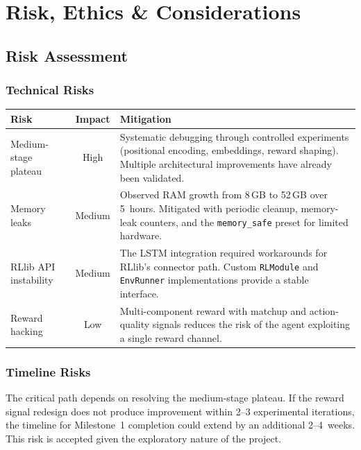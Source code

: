 \chapter{Risk, Ethics \& Considerations}
\label{ch:risk}

\section{Risk Assessment}

\subsection{Technical Risks}

\begin{center}
\small
\begin{tabularx}{\textwidth}{l c X}
  \toprule
  \textbf{Risk} & \textbf{Impact} & \textbf{Mitigation} \\
  \midrule
  Medium-stage plateau &
    High &
    Systematic debugging through controlled experiments (positional
    encoding, embeddings, reward shaping).  Multiple architectural
    improvements have already been validated. \\
  Memory leaks &
    Medium &
    Observed RAM growth from 8\,GB to 52\,GB over 5~hours.  Mitigated with
    periodic cleanup, memory-leak counters, and the \texttt{memory\_safe}
    preset for limited hardware. \\
  RLlib API instability &
    Medium &
    The LSTM integration required workarounds for RLlib's connector path.
    Custom \texttt{RLModule} and \texttt{EnvRunner} implementations provide
    a stable interface. \\
  Reward hacking &
    Low &
    Multi-component reward with matchup and action-quality signals reduces
    the risk of the agent exploiting a single reward channel. \\
  \bottomrule
\end{tabularx}
\end{center}

\subsection{Timeline Risks}

The critical path depends on resolving the medium-stage plateau.  If the
reward signal redesign does not produce improvement within 2--3 experimental
iterations, the timeline for Milestone~1 completion could extend by an
additional 2--4~weeks.  This risk is accepted given the exploratory nature of
the project.

